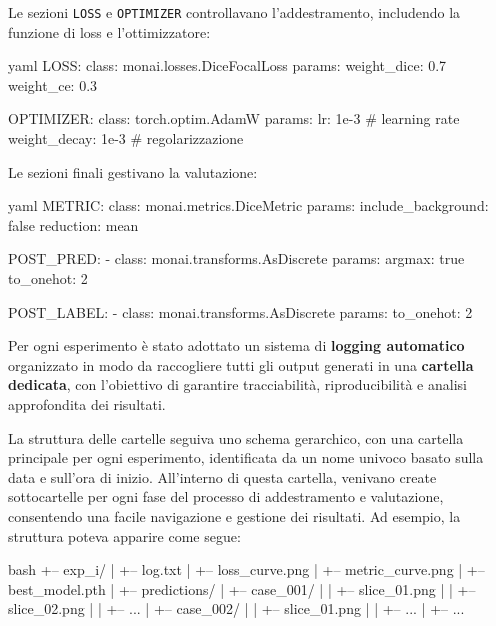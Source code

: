 Le sezioni \texttt{LOSS} e \texttt{OPTIMIZER} controllavano l'addestramento, includendo la funzione di loss e l'ottimizzatore:


\begin{code}{yaml}
LOSS:
  class: monai.losses.DiceFocalLoss
  params:
    weight_dice: 0.7
    weight_ce: 0.3

OPTIMIZER:
  class: torch.optim.AdamW
  params:
    lr: 1e-3               # learning rate
    weight_decay: 1e-3      # regolarizzazione
\end{code}


Le sezioni finali gestivano la valutazione:

\begin{code}{yaml}
METRIC:
  class: monai.metrics.DiceMetric
  params:
    include_background: false
    reduction: mean

POST_PRED:                                                                              
  - class: monai.transforms.AsDiscrete
    params:
      argmax: true
      to_onehot: 2

POST_LABEL:                                                                                 
  - class: monai.transforms.AsDiscrete
    params:
      to_onehot: 2
\end{code}




Per ogni esperimento è stato adottato un sistema di \textbf{logging automatico} organizzato in modo da raccogliere tutti gli output generati in una \textbf{cartella dedicata}, con l’obiettivo di garantire tracciabilità, riproducibilità e analisi approfondita dei risultati.

La struttura delle cartelle seguiva uno schema gerarchico, con una cartella principale per ogni esperimento, identificata da un nome univoco basato sulla data e sull'ora di inizio. All'interno di questa cartella, venivano create sottocartelle
per ogni fase del processo di addestramento e valutazione, consentendo una facile navigazione e gestione dei risultati. Ad esempio, la struttura poteva apparire come segue:\\
\begin{minipage}{\textwidth}
\begin{code}{bash}
+-- exp_i/
|   +-- log.txt
|   +-- loss_curve.png
|   +-- metric_curve.png
|   +-- best_model.pth
|   +-- predictions/
|       +-- case_001/
|       |   +-- slice_01.png
|       |   +-- slice_02.png
|       |   +-- ...
|       +-- case_002/
|       |   +-- slice_01.png
|       |   +-- ...
|       +-- ...
\end{code}
\end{minipage}
\\


